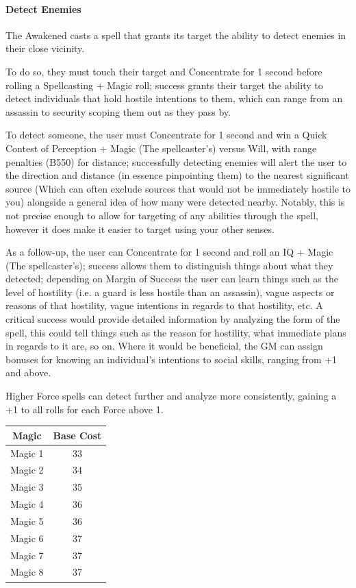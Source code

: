 \begin{multicols*}{3}
	\paragraph{Detect Enemies}
	
	The Awakened casts a spell that grants its target the ability to detect enemies in their close vicinity.
	
	To do so, they must touch their target and Concentrate for 1 second before rolling a Spellcasting + Magic roll; success grants their target the ability to detect individuals that hold hostile intentions to them, which can range from an assassin to security scoping them out as they pass by. 
	
	To detect someone, the user must Concentrate for 1 second and win a Quick Contest of Perception + Magic (The spellcaster's) versus Will, with range penalties (B550) for distance; successfully detecting enemies will alert the user to the direction and distance (in essence pinpointing them) to the nearest significant source (Which can often exclude sources that would not be immediately hostile to you) alongside a general idea of how many were detected nearby. Notably, this is not precise enough to allow for targeting of any abilities through the spell, however it does make it easier to target using your other senses.
	
	As a follow-up, the user can Concentrate for 1 second and roll an IQ + Magic (The spellcaster's); success allows them to distinguish things about what they detected; depending on Margin of Success the user can learn things such as the level of hostility (i.e. a guard is less hostile than an assassin), vague aspects or reasons of that hostility, vague intentions in regards to that hostility, etc. A critical success would provide detailed information by analyzing the form of the spell, this could tell things such as the reason for hostility, what immediate plans in regards to it are, so on. Where it would be beneficial, the GM can assign bonuses for knowing an individual's intentions to social skills, ranging from +1 and above.
	
	Higher Force spells can detect further and analyze more consistently, gaining a +1 to all rolls for each Force above 1.	
	
	\begin{center}
		\begin{tabular}{|c|c|}
			\hline
			Magic & Base Cost \\
			\hline
			\hline
			Magic 1 & 33 \\
			Magic 2 & 34 \\
			Magic 3 & 35 \\
			Magic 4 & 36 \\
			Magic 5 & 36 \\
			Magic 6 & 37 \\
			Magic 7 & 37 \\
			Magic 8 & 37 \\
			\hline
		\end{tabular}
	\end{center} 
	

\end{multicols*}
